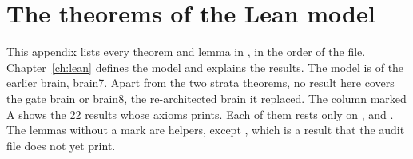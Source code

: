 \chapter{The theorems of the Lean model}\label{app:theorems}

This appendix lists every theorem and lemma in , in the order of the
file.
Chapter~\ref{ch:lean} defines the model and explains the results.
The model is of the earlier brain, brain7. Apart from the two strata theorems, no result here
covers the gate brain or brain8, the re-architected brain it replaced.
The column marked A shows the 22 results whose axioms  prints.
Each of them rests only on ,  and .
The lemmas without a mark are helpers, except , which is a result
that the audit file does not yet print.

